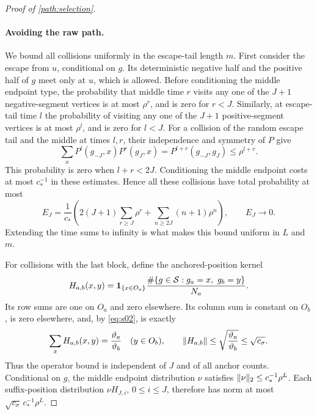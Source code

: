 \begin{proof}[Proof of \cref{path:selection}]
\paragraph{Avoiding the raw path.}
We bound all collisions uniformly in the escape-tail length $m$.
First consider the escape from $u$, conditional on $g$. Its deterministic
negative half and the positive half of $g$ meet only at $u$, which is
allowed. Before conditioning the middle endpoint type, the probability
that middle time $r$ visits any one of the $J+1$ negative-segment
vertices is at most $\rho^r$, and is zero for $r<J$. Similarly, at
escape-tail time $l$ the probability of visiting any one of the $J+1$
positive-segment vertices is at most $\rho^l$, and is zero for $l<J$.
For a collision of the random escape tail and the middle at times
$l,r$, their independence and symmetry of $P$ give
\[
 \sum_xP^l(g_{-J},x)P^r(g_J,x)
 =P^{l+r}(g_{-J},g_J)\le\rho^{l+r}.
\]
This probability is zero when $l+r<2J$. Conditioning the middle
endpoint costs at most $c_*^{-1}$ in these estimates. Hence all these
collisions have total probability at most
\begin{equation}
 E_J=\frac1{c_*}\left(
 2(J+1)\sum_{r\ge J}\rho^r
 +\sum_{n\ge2J}(n+1)\rho^n\right),
 \qquad E_J\longrightarrow0.
 \label{path:early-collisions}
\end{equation}
Extending the time sums to infinity is what makes this bound uniform
in $L$ and $m$.

For collisions with the last block, define the anchored-position kernel
\[
 H_{a,b}(x,y)=
 \mathbf 1_{\{x\in O_a\}}
 \frac{\#\{g\in\mathcal S:g_a=x,\ g_b=y\}}{N_a}.
\]
Its row sums are one on $O_a$ and zero elsewhere. Its column sum is
constant on $O_b$, is zero elsewhere, and, by \eqref{eq:s02}, is exactly
\begin{equation}
 \sum_xH_{a,b}(x,y)=\frac{\vartheta_a}{\vartheta_b}
 \quad(y\in O_b),\qquad
 \lVert H_{a,b}\rVert\le
 \sqrt{\frac{\vartheta_a}{\vartheta_b}}\le\sqrt{c_\sigma}.
 \label{path:position-kernel}
\end{equation}
Thus the operator bound is independent of $J$ and of all anchor counts.
Conditional on $g$, the middle endpoint distribution $\nu$ satisfies
$\lVert\nu\rVert_2\le c_*^{-1}\rho^L$. Each suffix-position distribution
$\nu H_{J,i}$, $0\le i\le J$, therefore has norm at most
$\sqrt{c_\sigma}\,c_*^{-1}\rho^L$.


\end{proof}
